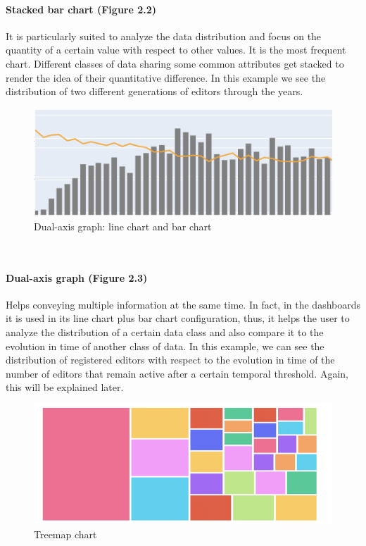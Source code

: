 \paragraph{Stacked bar chart (Figure 2.2)}
It is particularly suited to analyze the data distribution and focus on the quantity of a certain value with respect to other values. It is the most frequent chart. Different classes of data sharing some common attributes get stacked to render the idea of their quantitative difference.
In this example we see the distribution of two different generations of editors through the years.
\\
\begin{figure}[!ht]
  \centering
  \includegraphics[width=5in]{img/dual_axis_graph.png}
  \caption{Dual-axis graph: line chart and bar chart}
  \label{fig2.4}
\end{figure}
\\
\paragraph{Dual-axis graph (Figure 2.3)}
Helps conveying multiple information at the same time. In fact, in the dashboards it is used in its line chart plus bar chart configuration, thus, it helps the user to analyze the distribution of a certain data class and also compare it to the evolution in time of another class of data. In this example, we can see the distribution of registered editors with respect to the evolution in time of the number of editors that remain active after a certain temporal threshold. Again, this will be explained later.
\pagebreak
\\
\begin{figure}[!h]
  \centering
  \includegraphics[width=5in]{img/treemap.png}
  \caption{Treemap chart}
  \label{fig2.5}
\end{figure}
\\
